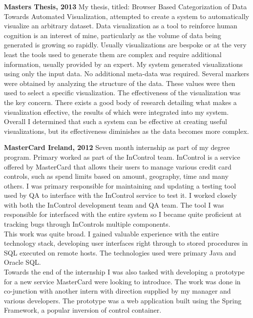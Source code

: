 \documentclass{res}
\begin{document}
\begin{resume}
    {\bf Masters Thesis, 2013} My thesis, titled: Browser Based Categorization of Data Towards Automated Visualization, attempted to create a system to automatically visualize an arbitrary dataset. Data visualization as a tool to reinforce human cognition is an interest of mine, particularly as the volume of data being generated is growing so rapidly. Usually visualizations are bespoke or at the very least the tools used to generate them are complex and require additional information, usually provided by an expert. My system generated visualizations using only the input data. No additional meta-data was required. Several markers were obtained by analyzing the structure of the data. These values were then used to select a specific visualization. The effectiveness of the visualization was the key concern. There exists a good body of research detailing what makes a visualization effective, the results of which were integrated into my system.\\
    Overall I determined that such a system can be effective at creating useful visualizations, but its effectiveness diminishes as the data becomes more complex.


    {\bf MasterCard Ireland, 2012} Seven month internship as part of my degree program. Primary worked as part of the InControl team. InControl is a service offered by MasterCard that allows their users to manage various credit card controls, such as spend limits based on amount, geography, time and many others. I was primary responsible for maintaining and updating a testing tool used by QA to interface with the InControl service to test it. I worked closely with both the InControl development team and QA team. The tool I was responsible for interfaced with the entire system so I became quite proficient at tracking bugs through InControls multiple components. \\
    This work was quite broad. I gained valuable experience with the entire technology stack, developing user interfaces right through to stored procedures in SQL executed on remote hosts. The technologies used were primary Java and Oracle SQL.\\
    Towards the end of the internship I was also tasked with developing a prototype for a new service MasterCard were looking to introduce. The work was done in co-junction with another intern with direction supplied by my manager and various developers. The prototype was a web application built using the Spring Framework, a popular inversion of control container.
     

\end{resume}
\end{document}
